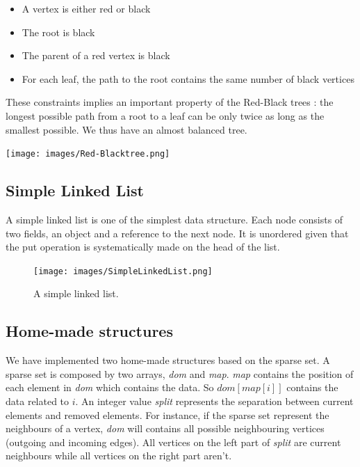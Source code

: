 \begin{itemize}
\item A vertex is either red or black
\item The root is black
\item The parent of a red vertex is black
\item For each leaf, the path to the root contains the same number of black vertices
\end{itemize}

These constraints implies an important property of the Red-Black trees : the longest possible path from a root to a leaf can be only twice as long as the smallest possible. We thus have an almost balanced tree.

\begin{center}
\texttt{[image: images/Red-Blacktree.png]}
\end{center}

\subsection{Simple Linked List}
A simple linked list is one of the simplest data structure. Each node consists of two fields, an object and a reference to the next node. It is unordered given that the put operation is systematically made on the head of the list.

\begin{figure}[!h]
\texttt{[image: images/SimpleLinkedList.png]}
\caption{A simple linked list.}
\end{figure}
\newpage
\subsection{Home-made structures}
We have implemented two home-made structures based on the sparse set. 
A sparse set is composed by two arrays, \textit{dom} and \textit{map}. \textit{map} contains the position of each element in \textit{dom} which contains the data. So $dom[map[i]]$ contains the data related to $i$. An integer value \textit{split} represents the separation between current elements and removed elements. For instance, if the sparse set represent the neighbours of a vertex, \textit{dom} will contains all possible neighbouring vertices (outgoing and incoming edges). All vertices on the left part of \textit{split} are current neighbours while all vertices on the right part aren't. \newline

